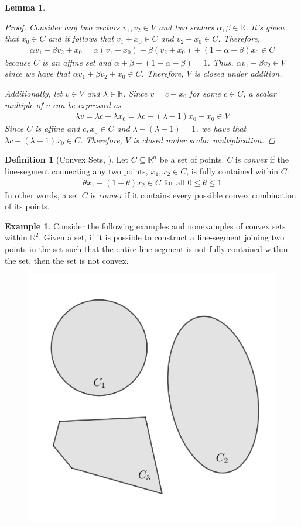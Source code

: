 \documentclass[11pt,reqno]{amsart}
\newcommand{\R}{\mathbb{R}}
\theoremstyle{plain}
\newtheorem{lemma}[theorem]{Lemma}
\theoremstyle{definition}
\newtheorem{example}[theorem]{Example}
\newtheorem{definition}[theorem]{Definition}
\begin{document}
{\begin{lemma}
\begin{proof}
        Consider any two vectors $v_1,v_2 \in V$ and two scalars $\alpha,\beta\in\R$. It's given that $x_0 \in C$ and it follows that $v_1 + x_0 \in C$ and $v_2 + x_0 \in C$. Therefore,
        \begin{align*}
            \alpha v_1 + \beta v_2 + x_0 = \alpha(v_1 + x_0) + \beta(v_2 + x_0) + (1 - \alpha - \beta)x_0 \in C
        \end{align*}
        because $C$ is an affine set and $\alpha + \beta + (1 - \alpha - \beta) = 1$. Thus, $\alpha v_1 + \beta v_2 \in V$ since we have that $\alpha v_1 + \beta v_2 + x_0 \in C$. Therefore, $V$ is closed under addition.
        
        Additionally, let $v\in V$ and $\lambda\in\R$. Since $v = c - x_0$ for some $c\in C$, a scalar multiple of $v$ can be expressed as
        \begin{align*}
            \lambda v = \lambda c - \lambda x_0 = \lambda c - (\lambda - 1)x_0 - x_0 \in V
        \end{align*}
        Since $C$ is affine and $c,x_0\in C$ and $\lambda - (\lambda - 1) = 1$, we have that $\lambda c - (\lambda - 1)x_0\in C$. Therefore, $V$ is closed under scalar multiplication.
    \end{proof}
\end{lemma}
\smallskip
\begin{definition}[{Convex Sets, \cite[2.1.4]{boyd_vandenberghe_2004}}]
    Let $C\subseteq\R^n$ be a set of points. $C$ is \emph{convex} if the line-segment connecting any two points, $x_1,x_2\in C$, is fully contained within $C$:
    \begin{align*}
        \theta x_1 + (1 - \theta)x_2 \in C \text{ for all } 0 \leq \theta \leq 1
    \end{align*}
    In other words, a set $C$ is \emph{convex} if it contains every possible convex combination of its points.
\end{definition}
\smallskip
\begin{example}
    Consider the following examples and nonexamples of convex sets within $\R^2$. Given a set, if it is possible to construct a line-segment joining two points in the set such that the entire line segment is not fully contained within the set, then the set is not convex.
    \begin{figure}[h]
    \centering
    \begin{minipage}{.5\textwidth}
      \centering
      \includegraphics[height = 1.7 in]{convex.png}

\end{minipage}
\end{figure}
\end{example}}
\end{document}
